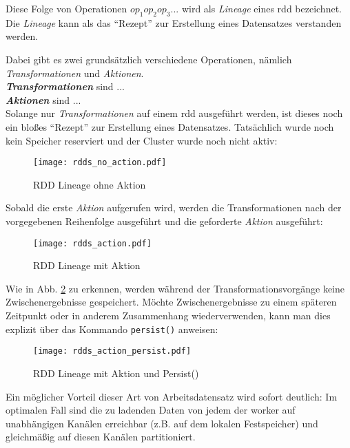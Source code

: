 Diese Folge von Operationen $op_1op_2op_3...$ wird als \textit{Lineage} eines \gls{rdd} bezeichnet. Die \textit{Lineage} kann als das "`Rezept"' zur Erstellung eines Datensatzes verstanden werden.

Dabei gibt es zwei grundsätzlich verschiedene Operationen, nämlich \textit{Transformationen} und \textit{Aktionen}.\\

\textbf{\textit{Transformationen}} sind ... \\

\textbf{\textit{Aktionen}} sind ... \\

Solange nur \textit{Transformationen} auf einem \gls{rdd} ausgeführt werden, ist dieses noch ein bloßes "`Rezept"' zur Erstellung eines Datensatzes. Tatsächlich wurde noch kein Speicher reserviert und der Cluster wurde noch nicht aktiv:\\

\begin{figure}[ht!]
	\centering
  \texttt{[image: rdds\_no\_action.pdf]}
	\caption{RDD Lineage ohne Aktion}
	\label{fig:rdds_no_action}
\end{figure}

Sobald die erste \textit{Aktion} aufgerufen wird, werden die Transformationen nach der vorgegebenen Reihenfolge ausgeführt und die geforderte \textit{Aktion} ausgeführt:\\

\begin{figure}[ht!]
	\centering
  \texttt{[image: rdds\_action.pdf]}
	\caption{RDD Lineage mit Aktion}
	\label{fig:rdds_action}
\end{figure}

Wie in Abb. \ref{fig:rdds_action} zu erkennen, werden während der Transformationsvorgänge keine Zwischenergebnisse gespeichert. Möchte Zwischenergebnisse zu einem späteren Zeitpunkt oder in anderem Zusammenhang wiederverwenden, kann man dies explizit über das Kommando \lstinline|persist()| anweisen:\\

\begin{figure}[ht!]
	\centering
  \texttt{[image: rdds\_action\_persist.pdf]}
	\caption{RDD Lineage mit Aktion und Persist()}
	\label{fig:rdds_action_persist}
\end{figure}


Ein möglicher Vorteil dieser Art von Arbeitsdatensatz wird sofort deutlich: Im optimalen Fall sind die zu ladenden Daten von jedem der \gls{worker} auf unabhängigen Kanälen erreichbar (z.B. auf dem lokalen Festspeicher) und gleichmäßig auf diesen Kanälen partitioniert.

